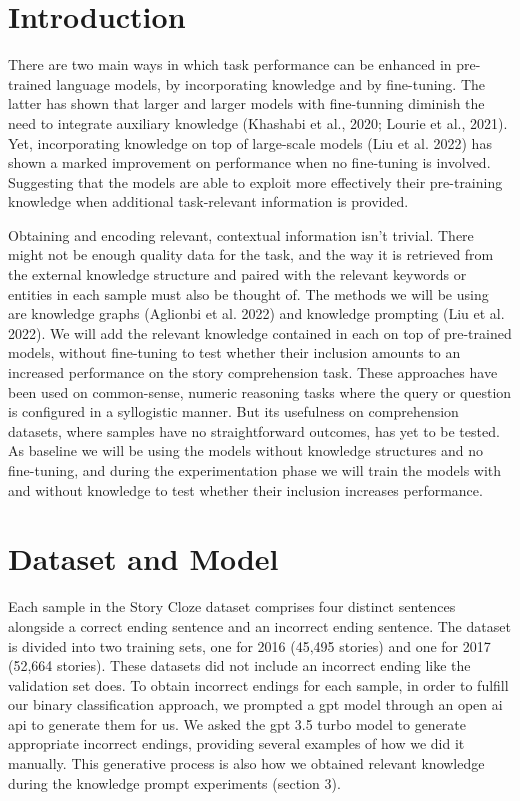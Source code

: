 \documentclass{article}
\begin{document}
\begin{multicols}{2}

\section{Introduction}
There are two main ways in which task performance can be enhanced in pre-trained language models, by incorporating knowledge and by fine-tuning. The latter has shown that larger and larger models with fine-tunning diminish the need to integrate auxiliary knowledge (Khashabi et al., 2020; Lourie et al., 2021). Yet, incorporating knowledge on top of large-scale models (Liu et al. 2022) has shown a marked improvement on performance when no fine-tuning is involved. Suggesting that the models are able to exploit more effectively their pre-training knowledge when additional task-relevant information is provided. 

Obtaining and encoding relevant, contextual information isn't trivial. There might not be enough quality data for the task, and the way it is retrieved from the external knowledge structure and paired with the relevant keywords or entities in each sample must also be thought of. 
The methods we will be using are knowledge graphs (Aglionbi et al. 2022) and knowledge prompting (Liu et al. 2022). We will add the relevant knowledge contained in each on top of pre-trained models, without fine-tuning to test whether their inclusion amounts to an increased performance on the story comprehension task. These approaches have been used on common-sense, numeric reasoning tasks where the query or question is configured in a syllogistic manner. But its usefulness on comprehension datasets, where samples have no straightforward outcomes, has yet to be tested. As baseline we will be using the models without knowledge structures and no fine-tuning, and during the experimentation phase we will train the models with and without knowledge to test whether their inclusion increases performance. 


\section{Dataset and Model}
Each sample in the Story Cloze dataset comprises four distinct sentences alongside a correct ending sentence and an incorrect ending sentence. The dataset is divided into two training sets, one for 2016 (45,495 stories) and one for 2017 (52,664 stories). These datasets did not include an incorrect ending like the validation set does. To obtain incorrect endings for each sample, in order to fulfill our binary classification approach, we prompted a gpt model through an open ai api to generate them for us. We asked the gpt 3.5 turbo model to generate appropriate incorrect endings, providing several examples of how we did it manually. This generative process is also how we obtained relevant knowledge during the knowledge prompt experiments (section 3). 


\end{multicols}
\end{document}
